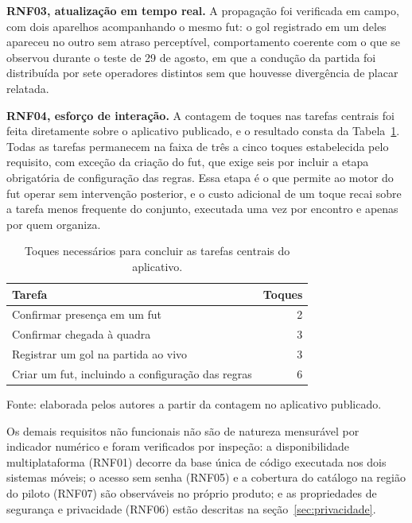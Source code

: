     \textbf{RNF03, atualização em tempo real.} A propagação foi verificada em campo, com dois aparelhos acompanhando o mesmo fut: o gol registrado em um deles apareceu no outro sem atraso perceptível, comportamento coerente com o que se observou durante o teste de 29 de agosto, em que a condução da partida foi distribuída por sete operadores distintos sem que houvesse divergência de placar relatada.

    \textbf{RNF04, esforço de interação.} A contagem de toques nas tarefas centrais foi feita diretamente sobre o aplicativo publicado, e o resultado consta da Tabela~\ref{tab:rnf04-toques}. Todas as tarefas permanecem na faixa de três a cinco toques estabelecida pelo requisito, com exceção da criação do fut, que exige seis por incluir a etapa obrigatória de configuração das regras. Essa etapa é o que permite ao motor do fut operar sem intervenção posterior, e o custo adicional de um toque recai sobre a tarefa menos frequente do conjunto, executada uma vez por encontro e apenas por quem organiza.

    \begin{table}[htb]
        \centering
        \caption{Toques necessários para concluir as tarefas centrais do aplicativo.}
        \label{tab:rnf04-toques}
        \begin{tabular}{p{7.3cm}r}
            \toprule
            \textbf{Tarefa} & \textbf{Toques} \\
            \midrule
            Confirmar presença em um fut & 2 \\
            Confirmar chegada à quadra & 3 \\
            Registrar um gol na partida ao vivo & 3 \\
            Criar um fut, incluindo a configuração das regras & 6 \\
            \bottomrule
        \end{tabular}

        \vspace{2pt}
        {\footnotesize Fonte: elaborada pelos autores a partir da contagem no aplicativo publicado.}
    \end{table}

    Os demais requisitos não funcionais não são de natureza mensurável por indicador numérico e foram verificados por inspeção: a disponibilidade multiplataforma (RNF01) decorre da base única de código executada nos dois sistemas móveis; o acesso sem senha (RNF05) e a cobertura do catálogo na região do piloto (RNF07) são observáveis no próprio produto; e as propriedades de segurança e privacidade (RNF06) estão descritas na seção~\ref{sec:privacidade}.

